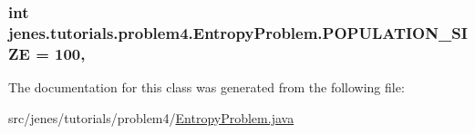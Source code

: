 \hypertarget{classjenes_1_1tutorials_1_1problem4_1_1_entropy_problem_a7827e623f64bde3d796783fd44f61ec2}{
\subsubsection[{P\-O\-P\-U\-L\-A\-T\-I\-O\-N\-\_\-\-S\-I\-Z\-E}]{\setlength{\rightskip}{0pt plus 5cm}int jenes.\-tutorials.\-problem4.\-Entropy\-Problem.\-P\-O\-P\-U\-L\-A\-T\-I\-O\-N\-\_\-\-S\-I\-Z\-E = 100\hspace{0.3cm}{\ttfamily [static]}, {\ttfamily [private]}}}\label{classjenes_1_1tutorials_1_1problem4_1_1_entropy_problem_a7827e623f64bde3d796783fd44f61ec2}


The documentation for this class was generated from the following file\-:\begin{DoxyCompactItemize}
\item 
src/jenes/tutorials/problem4/\hyperlink{problem4_2_entropy_problem_8java}{Entropy\-Problem.\-java}\end{DoxyCompactItemize}
